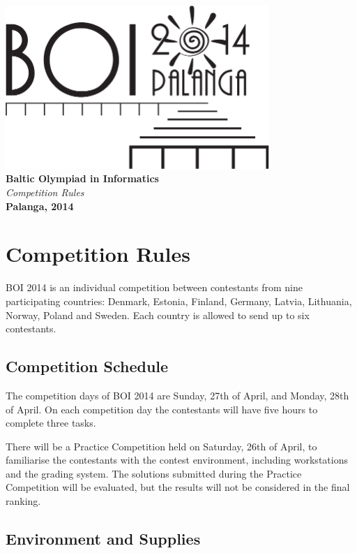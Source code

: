 \documentclass[a5paper,10pt,twoside]{book}
\begin{document}
\begin{titlepage}
\begin{center}
\includegraphics[width=10cm]{boi2014-bw}\\[2cm]
{\bfseries\Huge Baltic Olympiad in Informatics}\\[1.5cm]
{\Huge\it Competition Rules}\\
\vfill
{\bfseries\LARGE Palanga, 2014}
\end{center}
\end{titlepage}

\chapter{Competition Rules}

BOI 2014 is an individual competition between contestants from nine
participating countries: Denmark, Estonia, Finland, Germany, Latvia, Lithuania,
Norway, Poland and Sweden. Each country is allowed to send up to six
contestants.

\section{Competition Schedule}

The competition days of BOI 2014 are Sunday, 27th of April, and Monday, 28th of
April. On each competition day the contestants will have five hours to complete
three tasks.

There will be a Practice Competition held on Saturday, 26th of April, to
familiarise the contestants with the contest environment, including workstations
and the grading system. The solutions submitted during the Practice Competition
will be evaluated, but the results will not be considered in the final ranking.

\section{Environment and Supplies}
\end{document}
